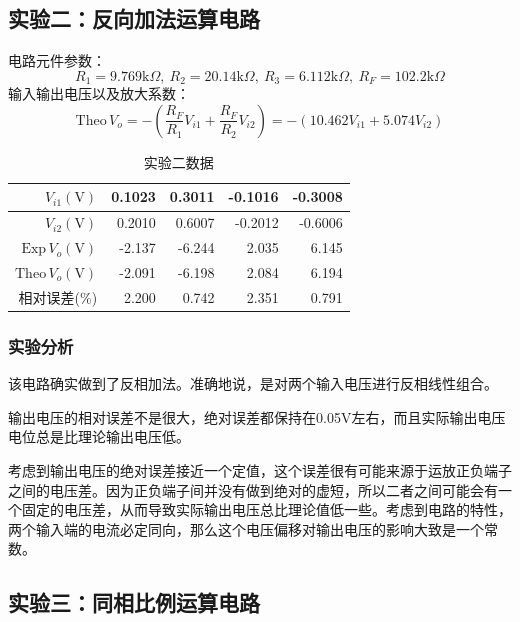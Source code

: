 \documentclass[a4paper,11pt,UTF8]{ctexart}
\newcommand\mr[1]{\mathrm{#1}}
\begin{document}
\subsection{实验二：反向加法运算电路}
电路元件参数：
\[ R_1=9.769\mr{k}\Omega,~R_2=20.14\mr{k}\Omega,~R_3=6.112\mr{k}\Omega,~R_F=102.2\mr{k}\Omega \]
输入输出电压以及放大系数：
\[ \mr{Theo}\,V_o=-\left( \frac{R_F}{R_1}V_{i1}+\frac{R_F}{R_2}V_{i2} \right)=-(10.462V_{i1}+5.074V_{i2}) \]
\begin{table}[H]
 \centering
 \begin{tabular}{|r|r|r|r|r|}
 \hline
  $V_{i1}(\mr{V})$ &0.1023 &0.3011 &-0.1016 &-0.3008
  \\\hline
  $V_{i2}(\mr{V})$ &0.2010 &0.6007 &-0.2012 &-0.6006
  \\\hline
  $\mr{Exp}\,V_o(\mr{V})$ &-2.137 &-6.244 &2.035 &6.145
  \\\hline
  $\mr{Theo}\,V_o(\mr{V})$ &-2.091 &-6.198 &2.084 &6.194
  \\\hline
  相对误差(\%) &2.200 &0.742 &2.351 &0.791
  \\\hline
 \end{tabular}
 \caption{实验二数据}
\end{table}
\subsubsection{实验分析}
该电路确实做到了反相加法。准确地说，是对两个输入电压进行反相线性组合。
\par 输出电压的相对误差不是很大，绝对误差都保持在0.05V左右，而且实际输出电压电位总是比理论输出电压低。
\par 考虑到输出电压的绝对误差接近一个定值，这个误差很有可能来源于运放正负端子之间的电压差。因为正负端子间并没有做到绝对的虚短，所以二者之间可能会有一个固定的电压差，从而导致实际输出电压总比理论值低一些。考虑到电路的特性，两个输入端的电流必定同向，那么这个电压偏移对输出电压的影响大致是一个常数。

\subsection{实验三：同相比例运算电路}
\end{document}
